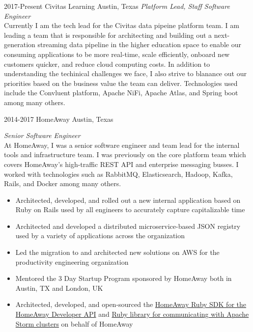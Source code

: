 \documentclass{friggeri-cv} %
\begin{document}
\begin{entrylist}
\entry
{2017-Present}
{Civitas Learning}
{Austin, Texas}
{\emph{Platform Lead, Staff Software Engineer} \\
Currently I am the tech lead for the Civitas data pipeine platform team. I am leading a team that is responsible for architecting and building out a next-generation streaming data pipeline in the higher education space to enable our consuming applications to be more real-time, scale efficiently, onboard new customers quicker, and reduce cloud computing costs. In addition to understanding the techinical challenges we face, I also strive to blanance out our priorities based on the business value the team can deliver. Technologies used include the Convluent platform, Apache NiFi, Apache Atlas, and Spring boot among many others.}
\end{entrylist}
\begin{entrylist}
\entry
{2014-2017}
{HomeAway}
{Austin, Texas}
{\emph{Senior Software Engineer} \\
At HomeAway, I was a senior software engineer and team lead for the internal tools and infrastructure team. I was previously on the core platform team which covers HomeAway's high-traffic REST API and enterprise messaging busses. I worked with technologies such as RabbitMQ, Elasticsearch, Hadoop, Kafka, Rails, and Docker among many others. \\
\begin{itemize}
\item Architected, developed, and rolled out a new internal application based on Ruby on Rails used by all engineers to accurately capture capitalizable time
\item Architected and developed a distributed microservice-based JSON registry used by a variety of applications across the organization
\item Led the migration to and architected new solutions on AWS for the productivity engineering organization
\item Mentored the 3 Day Startup Program sponsored by HomeAway both in Austin, TX and London, UK
\item Architected, developed, and open-sourced the \href{https://github.com/homeaway/homeaway_api_ruby}{HomeAway Ruby SDK for the HomeAway Developer API} and \href{https://github.com/homeaway/homeaway-storm}{Ruby library for communicating with Apache Storm clusters} on behalf of HomeAway
\end{itemize}}
\end{entrylist}
\end{document}
